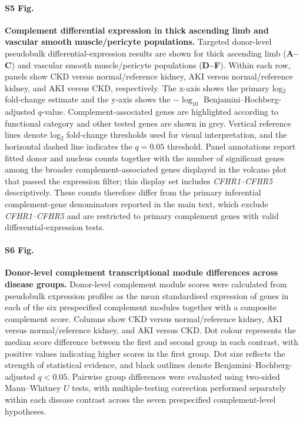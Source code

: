 \documentclass[10pt,letterpaper]{article}
\begin{document}
\paragraph*{S5 Fig.}
\label{S5_Fig}
\textbf{Complement differential expression in thick ascending limb and vascular smooth muscle/pericyte populations.}
Targeted donor-level pseudobulk differential-expression results are shown for thick ascending limb (\textbf{A--C}) and vascular smooth muscle/pericyte populations (\textbf{D--F}). Within each row, panels show CKD versus normal/reference kidney, AKI versus normal/reference kidney, and AKI versus CKD, respectively. The x-axis shows the primary log$_2$ fold-change estimate and the y-axis shows the $-\log_{10}$ Benjamini--Hochberg-adjusted $q$-value. Complement-associated genes are highlighted according to functional category and other tested genes are shown in grey. Vertical reference lines denote log$_2$ fold-change thresholds used for visual interpretation, and the horizontal dashed line indicates the $q=0.05$ threshold. Panel annotations report fitted donor and nucleus counts together with the number of significant genes among the broader complement-associated genes displayed in the volcano plot that passed the expression filter; this display set includes \textit{CFHR1--CFHR5} descriptively. These counts therefore differ from the primary inferential complement-gene denominators reported in the main text, which exclude \textit{CFHR1--CFHR5} and are restricted to primary complement genes with valid differential-expression tests.

\paragraph*{S6 Fig.}
\label{S6_Fig}
\textbf{Donor-level complement transcriptional module differences across disease groups.}
Donor-level complement module scores were calculated from pseudobulk expression profiles as the mean standardised expression of genes in each of the six prespecified complement modules together with a composite complement score. Columns show CKD versus normal/reference kidney, AKI versus normal/reference kidney, and AKI versus CKD. Dot colour represents the median score difference between the first and second group in each contrast, with positive values indicating higher scores in the first group. Dot size reflects the strength of statistical evidence, and black outlines denote Benjamini--Hochberg-adjusted $q<0.05$. Pairwise group differences were evaluated using two-sided Mann--Whitney $U$ tests, with multiple-testing correction performed separately within each disease contrast across the seven prespecified complement-level hypotheses.
\end{document}

